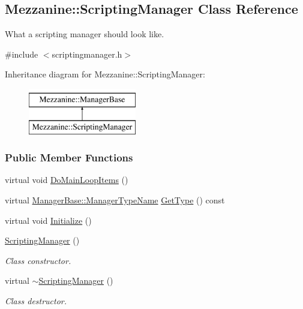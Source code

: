 \hypertarget{classMezzanine_1_1ScriptingManager}{
\subsection{Mezzanine::ScriptingManager Class Reference}
\label{classMezzanine_1_1ScriptingManager}
}


What a scripting manager should look like.  




{\ttfamily \#include $<$scriptingmanager.h$>$}

Inheritance diagram for Mezzanine::ScriptingManager:\begin{figure}[H]
\begin{center}
\leavevmode
\includegraphics[height=2.000000cm]{classMezzanine_1_1ScriptingManager}
\end{center}
\end{figure}
\subsubsection*{Public Member Functions}
\begin{DoxyCompactItemize}
\item 
virtual void \hyperlink{classMezzanine_1_1ScriptingManager_a82c560b4d99f6df817866e1a5ae7f947}{DoMainLoopItems} ()
\item 
virtual \hyperlink{classMezzanine_1_1ManagerBase_a08cecf5169cad3e82be81a3a159b0b6e}{ManagerBase::ManagerTypeName} \hyperlink{classMezzanine_1_1ScriptingManager_a6c9799934a3edb229df8a497ef9e4ddb}{GetType} () const 
\item 
virtual void \hyperlink{classMezzanine_1_1ScriptingManager_a472ede9f3d925b3eb4370d8b7f8de95b}{Initialize} ()
\item 
\hyperlink{classMezzanine_1_1ScriptingManager_a41b5cfe0b77fcf5fc68e1e4771cbdd6f}{ScriptingManager} ()
\begin{DoxyCompactList}\small\item\em Class constructor. \item\end{DoxyCompactList}\item 
\hypertarget{classMezzanine_1_1ScriptingManager_ab02a893a15e451624263c892928a88b8}{
virtual \hyperlink{classMezzanine_1_1ScriptingManager_ab02a893a15e451624263c892928a88b8}{$\sim$ScriptingManager} ()}
\label{classMezzanine_1_1ScriptingManager_ab02a893a15e451624263c892928a88b8}

\begin{DoxyCompactList}\small\item\em Class destructor. \item\end{DoxyCompactList}\end{DoxyCompactItemize}


